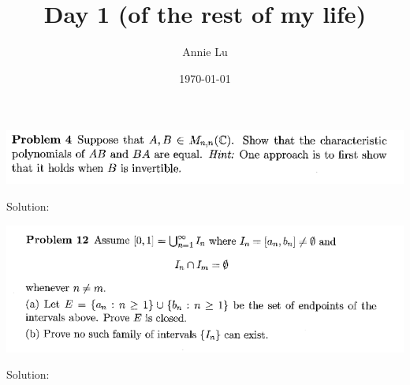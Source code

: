\documentclass{article}
\title{Day 1 (of the rest of my life)}
\author{Annie Lu}
\date{\today}
\begin{document}
\maketitle
\begin{center}
\includegraphics[width=\textwidth]{./Today's Questions/Question 1} \\
\end{center}

Solution:

\newpage
\begin{center}
\includegraphics[width=\textwidth]{./Today's Questions/Question 2} \\
\end{center}
Solution:
\end{document}
